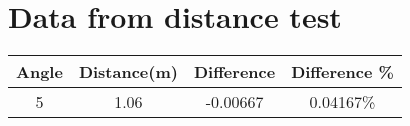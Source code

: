 \chapter{Data from distance test}

\begin{tabular}{c|c|c|c}
Angle & Distance(m) & Difference & Difference \% \\ \hline
5 	& 1.06	& -0.00667 & 0.04167\% \\ \hline
% 

\end{tabular}